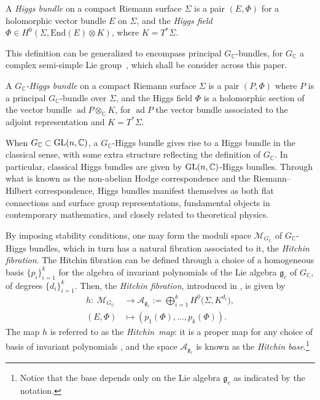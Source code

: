 \documentclass[pdftex]{sigma}
\numberwithin{equation}{section}
\begin{document}
 \begin{Definition}\label{def:clasical}\label{clas}
 A {\em Higgs bundle} on a compact Riemann surface $\Sigma$ is a pair $(E,\Phi)$ for a holomorphic vector bundle $E$ on $\Sigma$, and the {\em Higgs field} $\Phi\in H^{0}(\Sigma,\text{End}(E)\otimes K)$, where $K=T^*\Sigma$.
 \end{Definition}

 This definition can be generalized to encompass principal $ G_\mathbb{C}$-bundles, for $ G_\mathbb{C}$ a complex semi-simple Lie group~\cite{N2}, which shall be consider across this paper.
 \begin{Definition}\label{principalLie}\label{defHiggs}\label{complex}
 A {\em $G_\mathbb{C}$-Higgs bundle} on a compact Riemann surface $\Sigma$ is a pair $(P,\Phi)$ where $P$ is a principal $ G_\mathbb{C}$-bundle over $\Sigma$, and the Higgs field $\Phi$ is a holomorphic section of the vector bundle $\operatorname{ad}P\otimes_{\mathbb{C}} K$, for $\operatorname{ad} P$ the vector bundle associated to the adjoint representation and $K=T^*\Sigma$.
 \end{Definition}

When $ G_\mathbb{C}\subset {\rm GL}(n,\mathbb{C})$, a $ G_\mathbb{C}$-Higgs bundle gives rise to a Higgs bundle in the classical sense, with
some extra structure reflecting the definition of $ G_\mathbb{C}$. In particular, classical Higgs bundles are given by ${\rm GL}(n,\mathbb{C})$-Higgs bundles. Through what is known as the non-abelian Hodge correspondence \cite{cor,6,N1,57,yau} and the Riemann--Hilbert correspondence, Higgs bundles manifest themselves as both flat connections and surface group representations, fundamental objects in contemporary mathematics, and closely related to theoretical physics.

By imposing stability conditions, one may form the moduli space $\mathcal{M}_{ G_\mathbb{C}}$ of $G_\mathbb{C}$-Higgs bundles, which in turn has a natural fibration associated to it, the {\it Hitchin fibration}.
 The Hitchin fibration can be defined through a choice of a homogeneous basis $\{p_{i}\}_{i=1}^k$ for the algebra of invariant polynomials of the Lie algebra $\mathfrak{g}_{c}$ of $ G_\mathbb{C}$, of degrees $\{d_{i}\}_{i=1}^k$. Then, the {\em Hitchin fibration}, introduced in \cite{N2}, is given by
\begin{align}
 h\colon \ \mathcal{M}_{ G_\mathbb{C}}&\longrightarrow \mathcal{A}_{ \mathfrak{g}_c}:=\bigoplus_{i=1}^{k}H^{0}\big(\Sigma,K^{d_{i}}\big),\label{base1}\\
 (E,\Phi)&\mapsto (p_{1}(\Phi), \dots, p_{k}(\Phi)).\label{base2}
\end{align}
The map $h$ is referred to as the {\em Hitchin~map}: it is a proper map for any choice of basis of invariant polynomials \cite{N2}, and the space $\mathcal{A}_{ \mathfrak{g}_c}$ is known as the {\it Hitchin base}.\footnote{Notice that the base depends only on the Lie algebra $\mathfrak{g}_c$ as indicated by the notation.}
\end{document}
